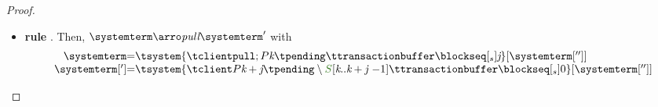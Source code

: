 \begin{proof}
\begin{itemize}
\begin{itemize}
				We  prove that $(\systemterm',\isystemterm') \ \in \ \mathcal{R}$ by showing that $\implements{\isystemterm[']}{\systemterm[']}$ 
				by checking the properties in .			
					\begin{enumerate}
						\item We will inspect the terms that have changed in client $\cid$ knowing as hypothesis that $\implements{\isystemterm}{\systemterm}$.
						\begin{itemize}
							
							\item By , $\transactionbuffer \triangleleft{\ttransactionbuffer}$. Now, the term in our abstract model is $\epsilon$ and in the implementation is $\emptydelta$, then, by \triangemptydelta this property holds.
							
						\item By , $\ireduce{\igetdeltas{\pending}\cdot{\pushbuffer}}\triangleleft \flatten{\tpending} \ $ however, after $\pushtran$ transition, we should build the following proof for 
						$\ireduce{\igetdeltas{\pending}\cdot{\pushbuffer}\cdot \transactionbuffer}\triangleleft \flatten{\tpending\cdot [\ttransactionbuffer]} \ $
						
					\[
						  \mathrulean{\lemref{lemma:reduce}}
						  {\ireduce{\igetdeltas{\pending}\cdot{\pushbuffer}} \triangleleft \flatten{\tpending}
								\quad
								\transactionbuffer \triangleleft \ttransactionbuffer}
  						{\ireduce{\igetdeltas{\pending}\cdot{\pushbuffer}\cdot \transactionbuffer}\triangleleft \flatten{\tpending\cdot [\ttransactionbuffer]}}  
					\]
					  \item By , $|\tsent_l| = n$, but $\tsent_l$ has incremented by one his size as $n$, so that this property is hold.
						\end{itemize}
						
						

					\end{enumerate}
					
	
	\item {\bf rule }. Then, $\systemterm  \arroi{\pulltran} \systemterm '$ with 
				\[\begin{array}{r@{=}l}
					\systemterm & \tsystem{\tclienti{\tpullins}{\tknown}{\tpending}{\ttransactionbuffer}{\tsent}{\treceivebuffer}}[{\systemterm['']}]
					\\
					\systemterm['] & \tsystem{\tclienti{\tprogram}{\tknown+\treceivebuffer}{\tpending \setminus \queuemessage[\tknown .. \tknown + \treceivebuffer {\ -1}]}{\ttransactionbuffer}{\tsent}{0}}[{\systemterm['']}]	
				  \end{array}
				\]
		

\end{itemize}
\end{itemize}
\end{proof}
